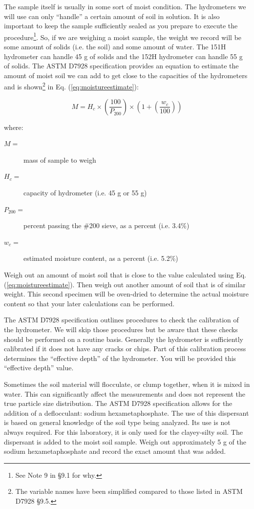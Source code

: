 \documentclass[12pt]{article}
\begin{document}
The sample itself is usually in some sort of moist condition. The hydrometers we will use can only ``handle'' a certain amount of soil in solution. It is also important to keep the sample sufficiently sealed as you prepare to execute the procedure\footnote{See Note 9 in \S9.1 for why.}. So, if we are weighing a moist sample, the weight we record will be some amount of solids (i.e. the soil) and some amount of water. The 151H hydrometer can handle 45 g of solids and the 152H hydrometer can handle 55 g of solids. The ASTM D7928 specification provides an equation to estimate the amount of moist soil we can add to get close to the capacities of the hydrometers and is shown\footnote{The variable names have been simplified compared to those listed in ASTM D7928 \S9.5.} in Eq. (\ref{eq:moistureestimate}):

\begin{equation}
    M=H_c\times \left(\dfrac{100}{P_{200}}\right)\times \left(1+\left(\dfrac{w_c}{100}\right)\right)
    \label{eq:moistureestimate}
\end{equation}

where:
\begin{description}
\item[$M=$]mass of sample to weigh
\item[$H_c=$] capacity of hydrometer (i.e. 45 g or 55 g)
\item[$P_{200}=$] percent passing the \#200 sieve, as a percent (i.e. 3.4\%)
\item[$w_c=$] estimated moisture content, as a percent (i.e. 5.2\%)
\end{description}

Weigh out an amount of moist soil that is close to the value calculated using Eq. (\ref{eq:moistureestimate}). Then weigh out another amount of soil that is of similar weight. This second specimen will be oven-dried to determine the actual moisture content so that your later calculations can be performed.

The ASTM D7928 specification outlines procedures to check the calibration of the hydrometer. We will skip those procedures but be aware that these checks should be performed on a routine basis. Generally the hydrometer is sufficiently calibrated if it does not have any cracks or chips. Part of this calibration process determines the ``effective depth'' of the hydrometer. You will be provided this ``effective depth'' value.

Sometimes the soil material will flocculate, or clump together, when it is mixed in water. This can significantly affect the measurements and does not represent the true particle size distribution. The ASTM D7928 specification allows for the addition of a deflocculant: sodium hexametaphosphate. The use of this dispersant is based on general knowledge of the soil type being analyzed. Its use is not always required. For this laboratory, it is only used for the clayey-silty soil. The dispersant is added to the moist soil sample. Weigh out approximately 5 g of the sodium hexametaphosphate and record the exact amount that was added.
\end{document}
